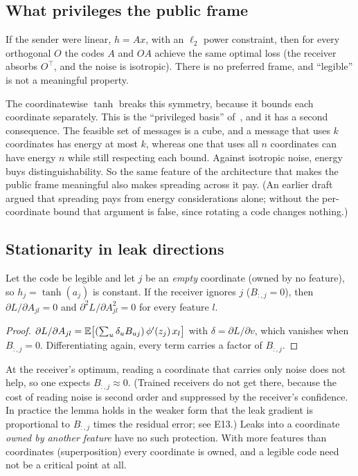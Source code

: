 \subsection{What privileges the public frame}
\begin{proposition}\proved
If the sender were linear, $h=Ax$, with an $\ell_2$ power constraint, then for every orthogonal $O$ the codes $A$
and $OA$ achieve the same optimal loss (the receiver absorbs $O^\top$, and the noise is isotropic). There is no
preferred frame, and ``legible'' is not a meaningful property.
\end{proposition}
The coordinatewise $\tanh$ breaks this symmetry, because it bounds each coordinate separately. This is the
``privileged basis'' of~\cite{TMS}, and it has a second consequence. The feasible set of messages is a cube, and a
message that uses $k$ coordinates has energy at most $k$, whereas one that uses all $n$ coordinates can have energy
$n$ while still respecting each bound. Against isotropic noise, energy buys distinguishability. So the same feature of the
architecture that makes the public frame meaningful also makes spreading across it pay. (An earlier draft argued
that spreading pays from energy considerations alone; without the per-coordinate bound that argument is false,
since rotating a code changes nothing.)

\subsection{Stationarity in leak directions}
\begin{lemma}\label{lem:stationary}\proved
Let the code be legible and let $j$ be an \emph{empty} coordinate (owned by no feature), so $h_j=\tanh(a_j)$ is
constant. If the receiver ignores $j$ ($B_{:,j}=0$), then $\partial L/\partial A_{jl}=0$ and
$\partial^2L/\partial A_{jl}^2=0$ for every feature $l$.
\end{lemma}
\begin{proof}
$\partial L/\partial A_{jl}=\mathbb E\big[(\sum_u\delta_uB_{uj})\,\phi'(z_j)\,x_l\big]$ with $\delta=\partial L/\partial v$,
which vanishes when $B_{:,j}=0$. Differentiating again, every term carries a factor of $B_{:,j}$.
\end{proof}
At the receiver's optimum, reading a coordinate that carries only noise does not help, so one expects
$B_{:,j}\approx0$. (Trained receivers do not get there, because the cost of reading noise is second order and
suppressed by the receiver's confidence. In practice the lemma holds in the weaker form that the leak gradient is
proportional to $B_{:,j}$ times the residual error; see E13.) Leaks into a coordinate \emph{owned by another feature} have no such protection. With more features
than coordinates (superposition) every coordinate is owned, and a legible code need not be a critical point at all.

